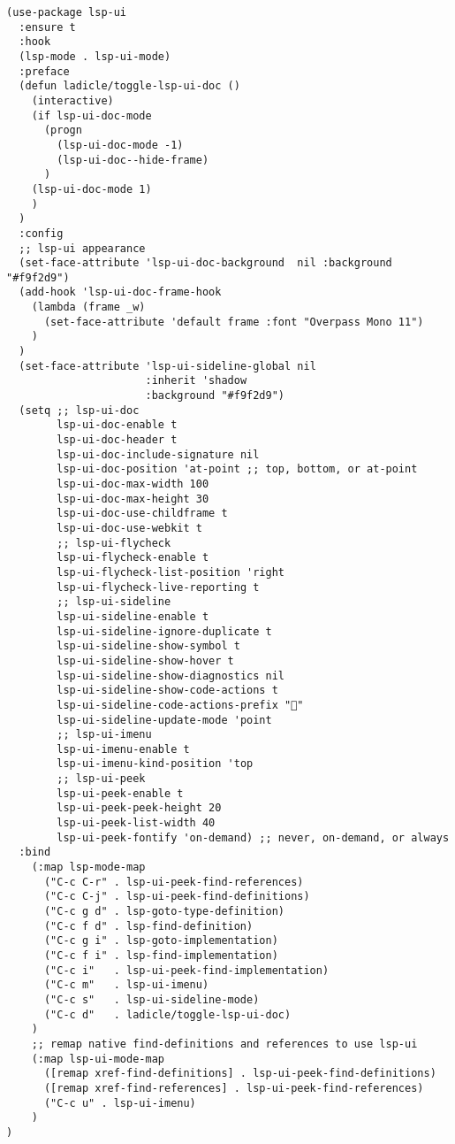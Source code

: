 \documentclass[11pt]{article}
\begin{document}
\begin{verbatim}
(use-package lsp-ui
  :ensure t
  :hook
  (lsp-mode . lsp-ui-mode)
  :preface
  (defun ladicle/toggle-lsp-ui-doc ()
    (interactive)
    (if lsp-ui-doc-mode
      (progn
        (lsp-ui-doc-mode -1)
        (lsp-ui-doc--hide-frame)
      )
    (lsp-ui-doc-mode 1)
    )
  )
  :config
  ;; lsp-ui appearance
  (set-face-attribute 'lsp-ui-doc-background  nil :background "#f9f2d9")
  (add-hook 'lsp-ui-doc-frame-hook
    (lambda (frame _w)
      (set-face-attribute 'default frame :font "Overpass Mono 11")
    )
  )
  (set-face-attribute 'lsp-ui-sideline-global nil
                      :inherit 'shadow
                      :background "#f9f2d9")
  (setq ;; lsp-ui-doc
        lsp-ui-doc-enable t
        lsp-ui-doc-header t
        lsp-ui-doc-include-signature nil
        lsp-ui-doc-position 'at-point ;; top, bottom, or at-point
        lsp-ui-doc-max-width 100
        lsp-ui-doc-max-height 30
        lsp-ui-doc-use-childframe t
        lsp-ui-doc-use-webkit t
        ;; lsp-ui-flycheck
        lsp-ui-flycheck-enable t
        lsp-ui-flycheck-list-position 'right
        lsp-ui-flycheck-live-reporting t
        ;; lsp-ui-sideline
        lsp-ui-sideline-enable t
        lsp-ui-sideline-ignore-duplicate t
        lsp-ui-sideline-show-symbol t
        lsp-ui-sideline-show-hover t
        lsp-ui-sideline-show-diagnostics nil
        lsp-ui-sideline-show-code-actions t
        lsp-ui-sideline-code-actions-prefix ""
        lsp-ui-sideline-update-mode 'point
        ;; lsp-ui-imenu
        lsp-ui-imenu-enable t
        lsp-ui-imenu-kind-position 'top
        ;; lsp-ui-peek
        lsp-ui-peek-enable t
        lsp-ui-peek-peek-height 20
        lsp-ui-peek-list-width 40
        lsp-ui-peek-fontify 'on-demand) ;; never, on-demand, or always
  :bind
    (:map lsp-mode-map
      ("C-c C-r" . lsp-ui-peek-find-references)
      ("C-c C-j" . lsp-ui-peek-find-definitions)
      ("C-c g d" . lsp-goto-type-definition)
      ("C-c f d" . lsp-find-definition)
      ("C-c g i" . lsp-goto-implementation)
      ("C-c f i" . lsp-find-implementation)
      ("C-c i"   . lsp-ui-peek-find-implementation)
      ("C-c m"   . lsp-ui-imenu)
      ("C-c s"   . lsp-ui-sideline-mode)
      ("C-c d"   . ladicle/toggle-lsp-ui-doc)
    )
    ;; remap native find-definitions and references to use lsp-ui
    (:map lsp-ui-mode-map
      ([remap xref-find-definitions] . lsp-ui-peek-find-definitions)
      ([remap xref-find-references] . lsp-ui-peek-find-references)
      ("C-c u" . lsp-ui-imenu)
    )
)
\end{verbatim}
\end{document}
